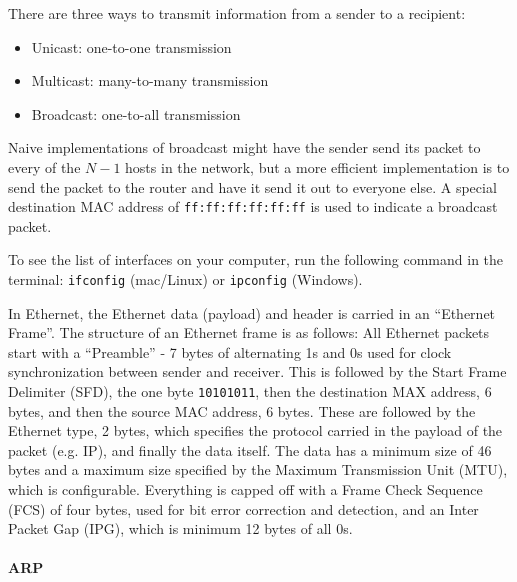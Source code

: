 There are three ways to transmit information from a sender to a
recipient:
\begin{itemize}
    \item Unicast: one-to-one transmission
    \item Multicast: many-to-many transmission
    \item Broadcast: one-to-all transmission
\end{itemize}

Naive implementations of
broadcast might have the sender send its packet to every of the
$N-1$ hosts in the network, but a more efficient implementation
is to send the packet to the router and have it send it out
to everyone else.
A special destination MAC address of \texttt{ff:ff:ff:ff:ff:ff} is used
to indicate a broadcast packet.

To see the list of interfaces on your computer, run the following
command in the terminal: \texttt{ifconfig} (mac/Linux) or
\texttt{ipconfig} (Windows).

In Ethernet, the Ethernet data (payload) and header is carried in an “Ethernet Frame”.
The structure of an Ethernet frame is as follows:
All Ethernet packets start with a “Preamble” - 7 bytes of alternating 1s and 0s
used for clock synchronization between sender and receiver.
This is followed by the Start Frame Delimiter (SFD), the one byte
\texttt{10101011}, then the destination MAX address, 6 bytes, and
then the source MAC address, 6 bytes. These are followed by the
Ethernet type, 2 bytes, which specifies the protocol carried in
the payload of the packet (e.g. IP), and finally the data itself.
The data has a minimum size of 46 bytes and a maximum size specified
by the Maximum Transmission Unit (MTU), which is configurable.
Everything is capped off with a Frame Check Sequence (FCS) of
four bytes, used for bit error correction and detection, and an
Inter Packet Gap (IPG), which is minimum 12 bytes of all 0s.

\paragraph{ARP}


